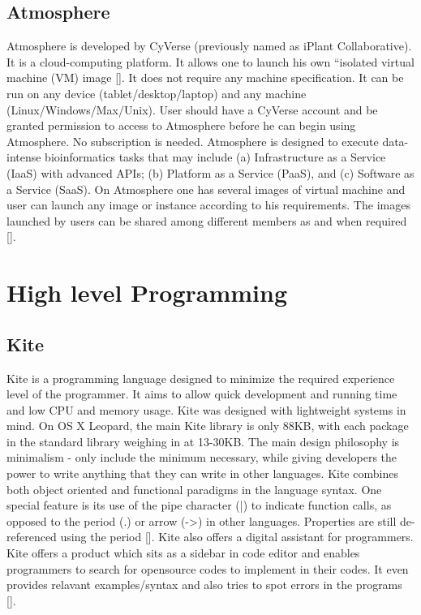 \subsection{Atmosphere}

Atmosphere is developed by CyVerse (previously named as iPlant
Collaborative).  It is a cloud-computing platform. It allows one to
launch his own ``isolated virtual machine (VM) image [\cite{www-at1}].
It does not require any machine specification. It can be run on any
device (tablet/desktop/laptop) and any machine
(Linux/Windows/Max/Unix).  User should have a CyVerse account and be
granted permission to access to Atmosphere before he can begin using
Atmosphere. No subscription is needed.  Atmosphere is designed to
execute data-intense bioinformatics tasks that may include
(a) Infrastructure as a Service (IaaS) with advanced APIs; (b) Platform as
a Service (PaaS), and (c) Software as a Service (SaaS).  On Atmosphere
one has several images of virtual machine and user can launch any
image or instance according to his requirements.  The images launched
by users can be shared among different members as and when
required [\cite{www-at2}].

\section{High level Programming}
\label{S:o-programming}

\subsection{Kite}

Kite is a programming language designed to minimize the required
experience level of the programmer.  It aims to allow quick
development and running time and low CPU and memory usage. Kite was
designed with lightweight systems in mind.  On OS X Leopard, the main
Kite library is only 88KB, with each package in the standard library
weighing in at 13-30KB. The main design philosophy is minimalism -
only include the minimum necessary, while giving developers the power
to write anything that they can write in other languages. Kite
combines both object oriented and functional paradigms in the language
syntax.  One special feature is its use of the pipe character (|) to
indicate function calls, as opposed to the period (.) or arrow (->) in
other languages.  Properties are still de-referenced using the
period [\cite{kite-devtopics}]. Kite also offers a digital assistant for
programmers. Kite offers a product which sits as a sidebar in code
editor and enables programmers to search for opensource codes to
implement in their codes. It even provides relavant examples/syntax
and also tries to spot errors in the programs [\cite{kite-wired}].
     
